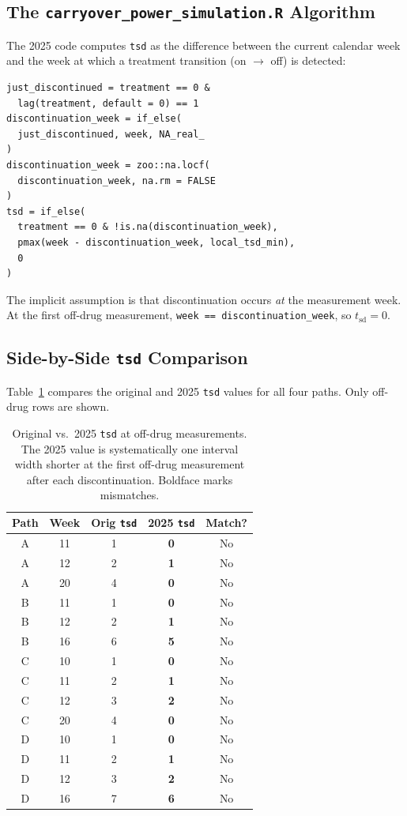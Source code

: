 \documentclass[11pt]{article}
\begin{document}
\subsection{The \texttt{carryover\_power\_simulation.R} Algorithm}

The 2025 code computes \texttt{tsd} as the difference between the
current calendar week and the week at which a treatment transition
(on $\to$ off) is detected:

\begin{verbatim}
just_discontinued = treatment == 0 &
  lag(treatment, default = 0) == 1
discontinuation_week = if_else(
  just_discontinued, week, NA_real_
)
discontinuation_week = zoo::na.locf(
  discontinuation_week, na.rm = FALSE
)
tsd = if_else(
  treatment == 0 & !is.na(discontinuation_week),
  pmax(week - discontinuation_week, local_tsd_min),
  0
)
\end{verbatim}

The implicit assumption is that discontinuation occurs \emph{at} the
measurement week. At the first off-drug measurement,
\texttt{week == discontinuation\_week}, so
$t_{\text{sd}} = 0$.

\subsection{Side-by-Side \texttt{tsd} Comparison}

Table~\ref{tab:tsd_compare} compares the original and 2025
\texttt{tsd} values for all four paths. Only off-drug rows are shown.

\begin{table}[h]
\centering
\caption{Original vs.\ 2025 \texttt{tsd} at off-drug measurements.
  The 2025 value is systematically one interval width shorter at the
  first off-drug measurement after each discontinuation. Boldface
  marks mismatches.}
\label{tab:tsd_compare}
\begin{tabular}{@{}ccccc@{}}
\toprule
Path & Week & Orig \texttt{tsd} & 2025 \texttt{tsd} & Match? \\
\midrule
A & 11 & 1 & \textbf{0} & No \\
A & 12 & 2 & \textbf{1} & No \\
A & 20 & 4 & \textbf{0} & No \\
\midrule
B & 11 & 1 & \textbf{0} & No \\
B & 12 & 2 & \textbf{1} & No \\
B & 16 & 6 & \textbf{5} & No \\
\midrule
C & 10 & 1 & \textbf{0} & No \\
C & 11 & 2 & \textbf{1} & No \\
C & 12 & 3 & \textbf{2} & No \\
C & 20 & 4 & \textbf{0} & No \\
\midrule
D & 10 & 1 & \textbf{0} & No \\
D & 11 & 2 & \textbf{1} & No \\
D & 12 & 3 & \textbf{2} & No \\
D & 16 & 7 & \textbf{6} & No \\
\bottomrule
\end{tabular}
\end{table}
\end{document}
